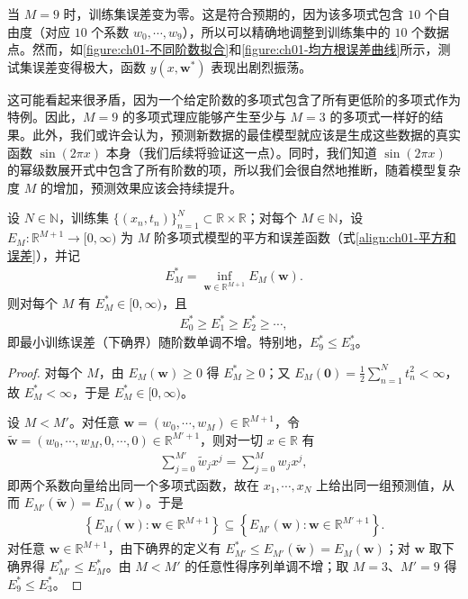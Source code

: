 \documentclass[../../main.tex]{subfiles}
\begin{document}
当 $M=9$ 时，训练集误差变为零。这是符合预期的，因为该多项式包含 $10$ 个自由度（对应 $10$ 个系数 $w_0,\cdots,w_9$），所以可以精确地调整到训练集中的 $10$ 个数据点。然而，如\cref{figure:ch01-不同阶数拟合}和\cref{figure:ch01-均方根误差曲线}所示，测试集误差变得极大，函数 $y(x,\mathbf{w}^{*})$ 表现出剧烈振荡。

这可能看起来很矛盾，因为一个给定阶数的多项式包含了所有更低阶的多项式作为特例。因此，$M=9$ 的多项式理应能够产生至少与 $M=3$ 的多项式一样好的结果。此外，我们或许会认为，预测新数据的最佳模型就应该是生成这些数据的真实函数 $\sin(2\pi x)$ 本身（我们后续将验证这一点）。同时，我们知道 $\sin(2\pi x)$ 的幂级数展开式中包含了所有阶数的项，所以我们会很自然地推断，随着模型复杂度 $M$ 的增加，预测效果应该会持续提升。

\begin{proposition}[训练误差随阶数单调不增]\label{proposition:ch01-训练误差单调性}
设 $N\in\mathbb{N}$，训练集 $\{(x_n,t_n)\}_{n=1}^{N}\subset\mathbb{R}\times\mathbb{R}$；对每个 $M\in\mathbb{N}$，设 $E_{M}:\mathbb{R}^{M+1}\to[0,\infty)$ 为 $M$ 阶多项式模型的平方和误差函数（式\eqref{align:ch01-平方和误差}），并记
\begin{align*}
  E_{M}^{*}=\inf_{\mathbf{w}\in\mathbb{R}^{M+1}}E_{M}(\mathbf{w}).
\end{align*}
则对每个 $M$ 有 $E_{M}^{*}\in[0,\infty)$，且
\begin{align*}
  E_{0}^{*} \geqslant E_{1}^{*} \geqslant E_{2}^{*} \geqslant \cdots,
\end{align*}
即最小训练误差（下确界）随阶数单调不增。特别地，$E_{9}^{*}\leqslant E_{3}^{*}$。
\end{proposition}

\begin{proof}
对每个 $M$，由 $E_{M}(\mathbf{w})\geqslant0$ 得 $E_{M}^{*}\geqslant0$；又 $E_{M}(\mathbf{0})=\frac{1}{2}\sum_{n=1}^{N}t_n^{2}<\infty$，故 $E_{M}^{*}<\infty$，于是 $E_{M}^{*}\in[0,\infty)$。

设 $M<M'$。对任意 $\mathbf{w}=(w_0,\cdots,w_M)\in\mathbb{R}^{M+1}$，令 $\tilde{\mathbf{w}}=(w_0,\cdots,w_M,0,\cdots,0)\in\mathbb{R}^{M'+1}$，则对一切 $x\in\mathbb{R}$ 有
\begin{align*}
 \sum_{j=0}^{M'} \tilde{w}_j x^{j} = \sum_{j=0}^{M} w_j x^{j},
\end{align*}
即两个系数向量给出同一个多项式函数，故在 $x_1,\cdots,x_N$ 上给出同一组预测值，从而 $E_{M'}(\tilde{\mathbf{w}})=E_{M}(\mathbf{w})$。于是
\begin{align*}
 \left\{E_{M}(\mathbf{w}) : \mathbf{w}\in\mathbb{R}^{M+1}\right\} \subseteq \left\{E_{M'}(\mathbf{w}) : \mathbf{w}\in\mathbb{R}^{M'+1}\right\}.
\end{align*}
对任意 $\mathbf{w}\in\mathbb{R}^{M+1}$，由下确界的定义有 $E_{M'}^{*}\leqslant E_{M'}(\tilde{\mathbf{w}})=E_{M}(\mathbf{w})$；对 $\mathbf{w}$ 取下确界得 $E_{M'}^{*}\leqslant E_{M}^{*}$。由 $M<M'$ 的任意性得序列单调不增；取 $M=3$、$M'=9$ 得 $E_{9}^{*}\leqslant E_{3}^{*}$。
\end{proof}
\end{document}
